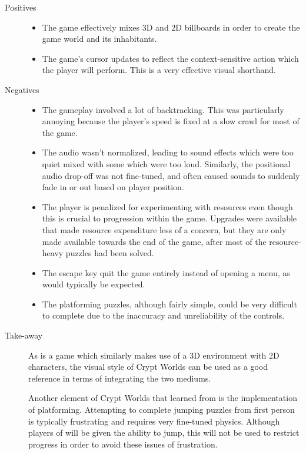 \begin{description}
\item[Positives]{
\begin{itemize}
\item{The game effectively mixes 3D and 2D billboards in order to create the game world and its inhabitants.}
\item{The game's cursor updates to reflect the context-sensitive action which the player will perform. This is a very effective visual shorthand.}
\end{itemize}
}
\item[Negatives]{
\begin{itemize}
\item{The gameplay involved a lot of backtracking. This was particularly annoying because the player's speed is fixed at a slow crawl for most of the game.}
\item{The audio wasn't normalized, leading to sound effects which were too quiet mixed with some which were too loud. Similarly, the positional audio drop-off was not fine-tuned, and often caused sounds to suddenly fade in or out based on player position.}
\item{The player is penalized for experimenting with resources even though this is crucial to progression within the game. Upgrades were available that made resource expenditure less of a concern, but they are only made available towards the end of the game, after most of the resource-heavy puzzles had been solved.}
\item{The escape key quit the game entirely instead of opening a menu, as would typically be expected.}
\item{The platforming puzzles, although fairly simple, could be very difficult to complete due to the inaccuracy and unreliability of the controls.}
\end{itemize}
}
\item[Take-away]{As \ourgame{} is a game which similarly makes use of a 3D environment with 2D characters, the visual style of Crypt Worlds can be used as a good reference in terms of integrating the two mediums.

Another element of Crypt Worlds that \ourteam{} learned from is the implementation of platforming. Attempting to complete jumping puzzles from first person is typically frustrating and requires very fine-tuned physics. Although players of \ourgame{} will be given the ability to jump, this will not be used to restrict progress in order to avoid these issues of frustration.}
\end{description}



